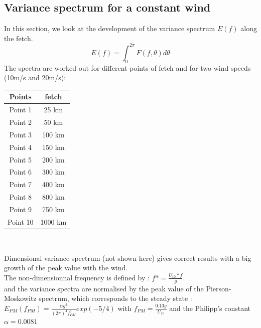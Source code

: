 \documentclass[10pt]{article}
\begin{document}
\subsection{Variance spectrum for a constant wind}
In this section, we look at the development of the variance spectrum $E(f)$
along the fetch.
\[ E(f) = \int_{0}^{2\pi} F(f,\theta )d\theta
\]
The spectra are worked out for different points of fetch and for two wind
speeds (10m/s and 20m/s):\\
\begin{center}
\begin{tabular}{c|c}
Points & fetch\\
\hline
Point 1 & 25 km \\
Point 2 & 50 km \\
Point 3 & 100 km \\
Point 4 & 150 km \\
Point 5 & 200 km\\
Point 6 & 300 km \\
Point 7 & 400 km \\
Point 8 & 800 km\\
Point 9 & 750 km\\
Point 10 & 1000 km\\
\end{tabular}\\
\end{center}
Dimensional variance spectrum (not shown here) gives correct results with a
big growth of the peak value with the wind.\\
The non-dimensionnal frequency is defined by : $f* = \frac{U_{10}*f}{g}$.\\
and the variance spectra are normalised by the peak value of the
Pierson-Moskowitz spectrum, which corresponds to the steady state :\\
$E_{PM}(f_{PM}) = \frac{\alpha g^2}{(2\pi)^4 f_{PM}^5} exp(-5/4)$ with
$f_{PM}=\frac{0.13 g}{U_{10}}$ and the Philipp's constant $\alpha = 0.0081$\\
\end{document}
